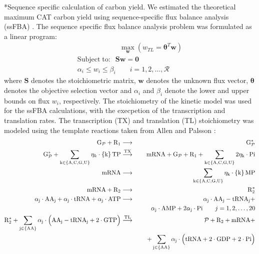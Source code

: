 \documentclass[12pt]{article}
\makeatletter
\renewcommand\subsection{\@startsection
	{subsection}{2}{0mm}
	{-0.05in}
	{-0.5\baselineskip}
	{\normalfont\normalsize\bfseries}}
\makeatother
\begin{document}
\subsection*{Sequence specific calculation of carbon yield.}
We estimated the theoretical maximum CAT carbon yield using sequence-specific flux balance analysis (ssFBA) \cite{Allen:2003aa}.
The sequence specific flux balance analysis problem was formulated as a linear program:
\begin{equation}
 \begin{multlined}
	\qquad \qquad \qquad \max_{\boldsymbol{w}}{} \! \left( w_{TL} = \mathbf{\boldsymbol{\theta}}^T \boldsymbol{w} \right) \\
	\mathrm{Subject \; to:}
	 \; \; \mathbf{S}\mathbf{w}=\mathbf{0} \\
\alpha_i \leq w_i \leq \beta_i  \qquad i=1,2,\hdots,\mathcal{R}
 \end{multlined}
\end{equation}
where $\mathbf{S}$ denotes the stoichiometric matrix, $\mathbf{w}$ denotes the unknown flux vector, $\boldsymbol{\theta}$ denotes the objective selection vector
and $\alpha_i$ and $\beta_i$ denote the lower and upper bounds on flux $w_{i}$, respectively.
The stoichiometry of the kinetic model was used for the ssFBA calculations, with the execpetion of the transcription and translation rates.
The transcription (TX) and translation (TL) stoichiometry was modeled using the template reactions taken from Allen and Palsson \cite{Allen:2003aa}:
\begin{eqnarray*}
\mathrm{{G}_{\mathcal{P}}}+\mathrm{{R}_{1}} &\longrightarrow& \mathrm{G_{\mathcal{P}}^{*}} \\
\mathrm{G_{\mathcal{P}}^{*}}+\sum_{\mathrm{k\in\left\{A,C,G,U\right\}}}\eta_{k}\cdot \mathrm{\left\{k\right\}TP} &\overset{\rm TX}{\longrightarrow}& \mathrm{mRNA}+\mathrm{G_{\mathcal{P}}}+\mathrm{R_{1}}+ \mathrm{\sum_{k\in\left\{A,C,G,U\right\}}2\eta_{k}\cdot Pi}\\
\mathrm{mRNA} &\longrightarrow& \mathrm{\sum_{k\in\left\{A,C,G,U\right\}}\eta_{k}\cdot \left\{k\right\}MP} \\
\mathrm{mRNA}+\mathrm{R_{2}} &\longrightarrow& \mathrm{R_{2}^{*}} \\
\mathrm{\alpha_{j}\cdot AA_{j}+\alpha_{j}\cdot tRNA+\alpha_{j}\cdot ATP} &\longrightarrow& \mathrm{\alpha_{j}\cdot AA_{j}-tRNA_{j}+}\\
&& \mathrm{\qquad \alpha_{j}\cdot AMP+2\alpha_{j}\cdot Pi} \qquad{j=1,2,\hdots,20}\\
\mathrm{R_{2}^{*}+\sum_{j\in\left\{AA\right\}}\alpha_{j}\cdot \Big(AA_{j}-tRNA_{j}+2\cdot GTP\Big)} &\stackrel{\rm TL}{\longrightarrow}& \mathcal{P}+\mathrm{R_{2}+mRNA}+\\
&& \mathrm{\quad +\sum_{j\in\left\{AA\right\}}\alpha_{j}\cdot\Big(tRNA+2\cdot GDP+2\cdot Pi\Big)}
\end{eqnarray*}
\end{document}
